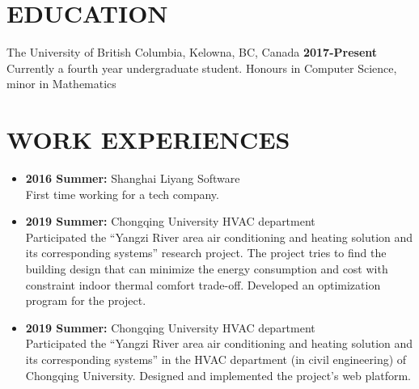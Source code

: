 \documentclass{res}
\begin{document}

\address{jimmy123good@hotmail.com \\ https://github.com/ailrk \\ https://ailrk.github.io/home \\ (250) 899 2600}
\begin{resume}

\section{EDUCATION}
The University of British Columbia, Kelowna, BC, Canada  \hspace{1.2in} \textbf{2017-Present}\\
    Currently a fourth year undergraduate student. Honours in Computer Science, minor in Mathematics \\

\section{WORK EXPERIENCES}
\begin{itemize}[leftmargin=-.1in]
    \setlength\itemsep{-1em}
    \item \textbf{2016 Summer:} Shanghai Liyang Software
    \vspace{0.05in}\\
    First time working for a tech company. \\
    \item \textbf{2019 Summer:} Chongqing University HVAC department
        \vspace{0.05in}\\ Participated the ``Yangzi River area air conditioning and heating solution and its corresponding systems'' research project. The project tries to find the building design that can minimize the energy consumption and cost with constraint indoor thermal comfort trade-off. Developed an optimization program for the project. \\
    \item \textbf{2019 Summer:} Chongqing University HVAC department
    \vspace{0.05in}\\
    Participated the ``Yangzi River area air conditioning and heating solution and its corresponding systems'' in the HVAC department (in civil engineering) of Chongqing University.  Designed and implemented the project's web platform. \\


\end{itemize}
\end{resume}
\end{document}
